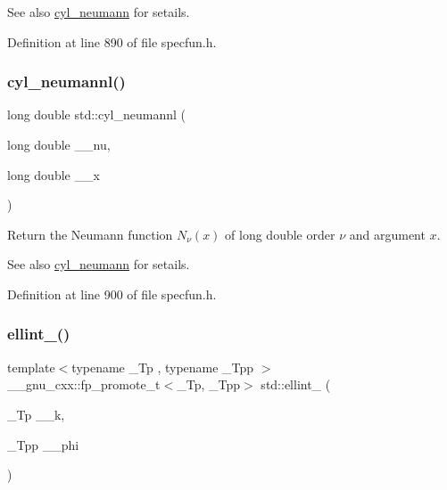 \begin{DoxySeeAlso}{See also}
\hyperlink{group__cxx17__math__spec__func_ga1e4bef23704469b0704cf15c5f04e29e}{cyl\+\_\+neumann} for setails. 
\end{DoxySeeAlso}


Definition at line 890 of file specfun.\+h.

\mbox{\label{group__cxx17__math__spec__func_gaf8986bae9a523c48d861d233835bda8f}} 
\subsubsection{\texorpdfstring{cyl\+\_\+neumannl()}{cyl\_neumannl()}}
{\footnotesize\ttfamily long double std\+::cyl\+\_\+neumannl (\begin{DoxyParamCaption}\item[{long double}]{\+\_\+\+\_\+nu,  }\item[{long double}]{\+\_\+\+\_\+x }\end{DoxyParamCaption})\hspace{0.3cm}{\ttfamily [inline]}}

Return the Neumann function $ N_{\nu}(x) $ of {\ttfamily long double} order $ \nu $ and argument $ x $.

\begin{DoxySeeAlso}{See also}
\hyperlink{group__cxx17__math__spec__func_ga1e4bef23704469b0704cf15c5f04e29e}{cyl\+\_\+neumann} for setails. 
\end{DoxySeeAlso}


Definition at line 900 of file specfun.\+h.

\mbox{\label{group__cxx17__math__spec__func_ga1550d6947bbbeee9865aabd398102a36}} 
\subsubsection{\texorpdfstring{ellint\+\_()}{ellint\_1()}}
{\footnotesize\ttfamily template$<$typename \+\_\+\+Tp , typename \+\_\+\+Tpp $>$ \\
\+\_\+\+\_\+gnu\+\_\+cxx\+::fp\+\_\+promote\+\_\+t$<$\+\_\+\+Tp, \+\_\+\+Tpp$>$ std\+::ellint\+\_ (\begin{DoxyParamCaption}\item[{\+\_\+\+Tp}]{\+\_\+\+\_\+k,  }\item[{\+\_\+\+Tpp}]{\+\_\+\+\_\+phi }\end{DoxyParamCaption})\hspace{0.3cm}{\ttfamily [inline]}}

